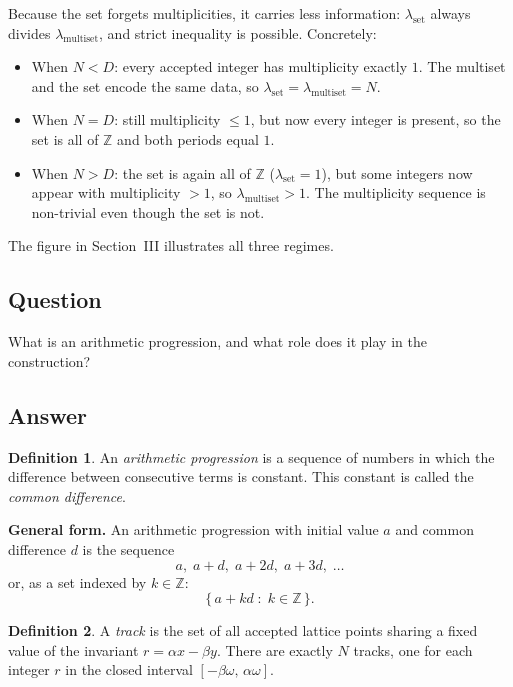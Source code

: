 \documentclass{amsart}
\theoremstyle{definition}
\newtheorem{defn}{Definition}
\theoremstyle{plain}
\theoremstyle{remark}
\begin{document}
\noindent
Because the set forgets multiplicities, it carries less information:
\(\lambda_{\mathrm{set}}\) always divides \(\lambda_{\mathrm{multiset}}\), and
strict inequality is possible.  Concretely:

\begin{itemize}
  \item When \(N < D\): every accepted integer has multiplicity exactly \(1\).
    The multiset and the set encode the same data, so
    \(\lambda_{\mathrm{set}} = \lambda_{\mathrm{multiset}} = N\).
  \item When \(N = D\): still multiplicity \(\le 1\), but now every integer is
    present, so the set is all of \(\mathbb{Z}\) and both periods equal \(1\).
  \item When \(N > D\): the set is again all of \(\mathbb{Z}\)
    (\(\lambda_{\mathrm{set}}=1\)), but some integers now appear with
    multiplicity \(>1\), so \(\lambda_{\mathrm{multiset}} > 1\).  The
    multiplicity sequence is non-trivial even though the set is not.
\end{itemize}

The figure in Section~III illustrates all three regimes.

\subsection*{Question}

What is an arithmetic progression, and what role does it play in the
construction?

\subsection*{Answer}

\begin{defn}
An \emph{arithmetic progression} is a sequence of numbers in which the
difference between consecutive terms is constant.  This constant is called
the \emph{common difference}.
\end{defn}

\noindent\textbf{General form.}
An arithmetic progression with initial value \(a\) and common difference \(d\)
is the sequence
\[
  a,\; a + d,\; a + 2d,\; a + 3d,\; \ldots
\]
or, as a set indexed by \(k \in \mathbb{Z}\):
\[
  \{\, a + kd \;:\; k \in \mathbb{Z} \,\}.
\]

\begin{defn}
A \emph{track} is the set of all accepted lattice points sharing a fixed value
of the invariant \(r = \alpha x - \beta y\).  There are exactly \(N\) tracks,
one for each integer \(r\) in the closed interval \([-\beta\omega,\,\alpha\omega]\).
\end{defn}
\end{document}
